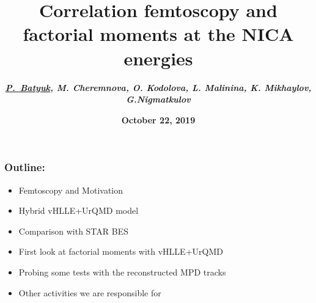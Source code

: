 \documentclass[dvipsnames] {beamer}
\title[\bf Poland, Warsaw, III NICA DAYS 2019, MPD Collaboration meeting]
      {\textbf{\large {{\color{darkred!70!black} Correlation femtoscopy and factorial moments at the NICA energies}}}}
\author[\bf P.~Batyuk]{\textit{\textbf{{\footnotesize \underline{P.~Batyuk}, M. Cheremnova, O. Kodolova, L. Malinina, K. Mikhaylov, G.Nigmatkulov}}}}
\institute{\bf on behalf of PWG3 (Correlations and Fluctuations)}
\date{{\textbf{October 22, 2019}}}
\begin{document}
      \maketitle

      \begin{frame}
        \bf
        \frametitle{\bf \centering Outline:}
        \begin{itemize}
        \item Femtoscopy and Motivation
        \item Hybrid vHLLE+UrQMD model
        \item Comparison with STAR BES
        \item First look at factorial moments with vHLLE+UrQMD
        \item Probing some tests with the reconstructed MPD tracks  
        \item Other activities we are responsible for
        \end{itemize}
      \end{frame}
\end{document}
